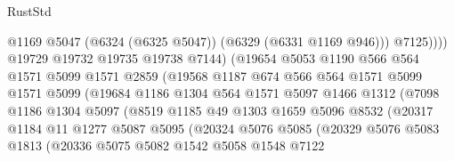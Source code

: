 \begin{lexlean}{RustStd}
\begin{coremodule}
{{                                    @1169
                                    @5047
                                    (@6324 (@6325 @5047))
                                    (@6329 (@6331 @1169 @946)))
                                  @7125))))
                          @19729
                          @19732
                          @19735
                          @19738
                          @7144)
                        (@19654
                          @5053
                          @1190
                          @566
                          @564
                          @1571
                          @5099
                          @1571
                          @2859
                          (@19568
                            @1187
                            @674
                            @566
                            @564
                            @1571
                            @5099
                            @1571
                            @5099
                            (@19684
                              @1186
                              @1304
                              @564
                              @1571
                              @5097
                              @1466
                              @1312
                              (@7098
                                @1186
                                @1304
                                @5097
                                (@8519
                                  @1185
                                  @49
                                  @1303
                                  @1659
                                  @5096
                                  @8532
                                  (@20317
                                    @1184
                                    @11
                                    @1277
                                    @5087
                                    @5095
                                    (@20324
                                      @5076
                                      @5085
                                      (@20329
                                        @5076
                                        @5083
                                        @1813
                                        (@20336
                                          @5075
                                          @5082
                                          @1542
                                          @5058
                                          @1548
                                          @7122
}}
\end{coremodule}
\end{lexlean}
